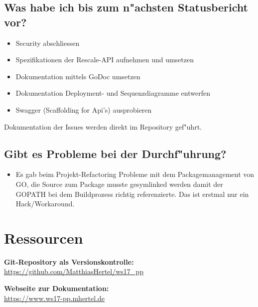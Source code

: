 \documentclass[12pt]{article}
\begin{document}
\subsection{Was habe ich bis zum n"achsten Statusbericht vor?}


\begin{itemize}
\item Security abschliessen
\item Spezifikationen der Rescale-API aufnehmen und umsetzen
\item Dokumentation mittels GoDoc umsetzen
\item Dokumentation Deployment- und Sequenzdiagramme entwerfen
\item Swagger (Scaffolding for Api's) ausprobieren
\end{itemize}

Dokumentation der Issues werden direkt im Repository gef"uhrt.

\subsection{Gibt es Probleme bei der Durchf"uhrung?}
\begin{itemize}
\item Es gab beim Projekt-Refactoring Probleme mit dem Packagemanagement von GO, die Source zum Package musste gesymlinked werden damit der GOPATH bei dem Buildprozess richtig referenzierte. Das ist erstmal nur ein Hack/Workaround.
\end{itemize}


\section{Ressourcen}
\textbf{Git-Repository als Versionskontrolle:}\\
\url{https://github.com/MatthiasHertel/ws17_pp}

\textbf{Webseite zur Dokumentation:}\\
\url{https://www.ws17-pp.mhertel.de}
\end{document}
